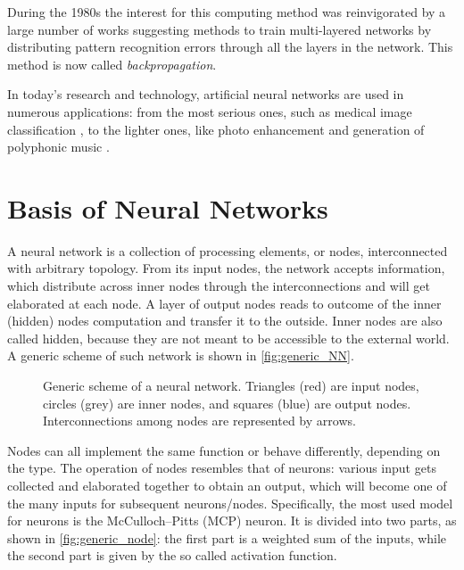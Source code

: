 During the 1980s the interest for this computing method was reinvigorated by a large number of works suggesting methods to train multi-layered networks by distributing pattern recognition errors through all the layers in the network.
This method is now called \textit{backpropagation}.

In today's research and technology, artificial neural networks are used in numerous applications: from the most serious ones, such as medical image classification \cite{li2014medical}, to the lighter ones, like photo enhancement \cite{ignatov2017wespe} and generation of polyphonic music \cite{johnson2017generating, briot2017deep}.

\section{Basis of Neural Networks}
\label{sec:Basis_of_Neural_Networks}

A neural network is a collection of processing elements, or nodes, interconnected with arbitrary topology.
From its input nodes, the network accepts information, which distribute across inner nodes through the interconnections and will get elaborated at each node.
A layer of output nodes reads to outcome of the inner (hidden) nodes computation and transfer it to the outside.
Inner nodes are also called hidden, because they are not meant to be accessible to the external world.
A generic scheme of such network is shown in \autoref{fig:generic_NN}.

\begin{figure}[ht]
	\centering
	
	\caption{	Generic scheme of a neural network.
						Triangles (red) are input nodes, circles (grey) are inner nodes,
						and squares (blue) are output nodes.
						Interconnections among nodes are represented by arrows.
						}
	\label{fig:generic_NN}
\end{figure}

Nodes can all implement the same function or behave differently, depending on the type.
The operation of nodes resembles that of neurons: various input gets collected and elaborated together to obtain an output, which will become one of the many inputs for subsequent neurons/nodes.
Specifically, the most used model for neurons is the McCulloch–Pitts (MCP) neuron.
It is divided into two parts, as shown in \autoref{fig:generic_node}: the first part is a weighted sum of the inputs, while the second part is given by the so called activation function.

